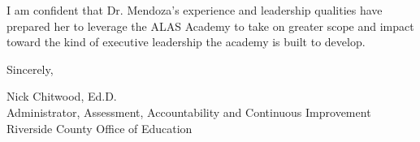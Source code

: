 \documentclass[11pt, letterpaper]{article}
\begin{document}
{I am confident that Dr. Mendoza's experience and leadership qualities have prepared her to leverage the ALAS Academy to take on greater scope and impact toward the kind of executive leadership the academy is built to develop.

\vspace{1mm}
Sincerely,

\vspace{8mm}
{\InterTightSemiBold Nick Chitwood, Ed.D.}\\[0.5mm]
{\fontsize{10}{13}\InterTightRegular\color{muted}Administrator, Assessment, Accountability and Continuous Improvement \textcolor{accent}{\textperiodcentered} Riverside County Office of Education}
}\par
\end{document}
